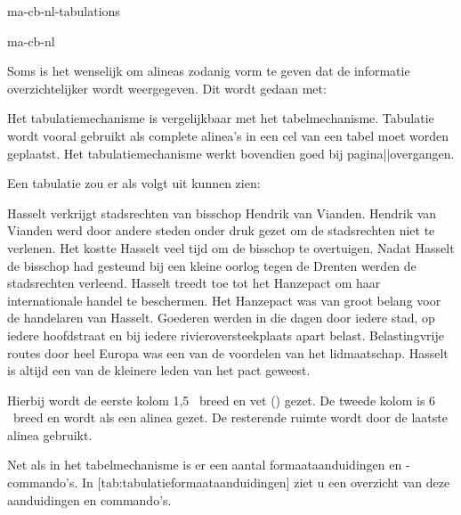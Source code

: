 \startonderdeel ma-cb-nl-tabulations

\produkt ma-cb-nl



Soms is het wenselijk om alineas zodanig vorm te geven dat
de informatie overzichtelijker wordt weergegeven. Dit wordt
gedaan met:


Het tabulatiemechanisme is vergelijkbaar met het
tabelmechanisme. Tabulatie wordt vooral gebruikt als complete
alinea's in een cel van een tabel moet worden geplaatst. Het
tabulatiemechanisme werkt bovendien goed bij
pagina||overgangen.

Een tabulatie zou er als volgt uit kunnen zien:

\startbuffer
\starttabulatie[|w(1.5cm)B|p(6.0cm)|p|]
    \NC Hasselt verkrijgt stadsrechten van bisschop Hendrik van
        Vianden.
    \NC Hendrik van Vianden werd door andere steden onder druk
        gezet om de stadsrechten niet te verlenen. Het kostte
        Hasselt veel tijd om de bisschop te overtuigen. Nadat
        Hasselt de bisschop had gesteund bij een kleine oorlog
        tegen de Drenten werden de stadsrechten verleend. \NC\NR
{}
    \NC Hasselt treedt toe tot het Hanzepact om haar internationale
        handel te beschermen.
    \NC Het Hanzepact was van groot belang voor de handelaren
        van Hasselt. Goederen werden in die dagen door iedere
        stad, op iedere hoofdstraat en bij iedere
        rivieroversteekplaats apart belast. Belastingvrije
        routes door heel Europa was een van de voordelen van
        het lidmaatschap. Hasselt is altijd een van de kleinere
        leden van het pact geweest. \NC\NR
\stoptabulatie
\stopbuffer

\typebuffer

Hierbij wordt de eerste kolom 1,5 \Centi \Meter\ breed en
vet () gezet. De tweede kolom is 6 \Centi \Meter\
breed en wordt als een alinea gezet. De resterende ruimte
wordt door de laatste alinea gebruikt.

\haalbuffer

Net als in het tabelmechanisme is er een aantal
formaataanduidingen en -commando's. In
[tab:tabulatieformaataanduidingen] ziet u een
overzicht van deze aanduidingen en commando's.

